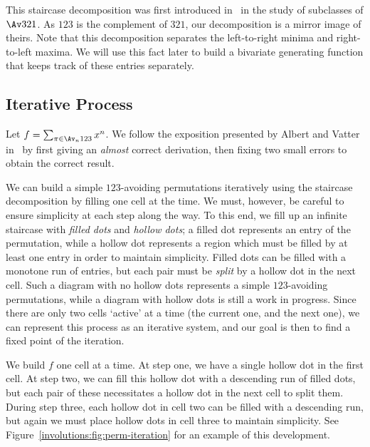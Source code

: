 \documentclass[12pt,twoside]{memoir}
\begin{document}
      This staircase decomposition was first introduced in~\cite{Albert2010} in
      the study of subclasses of $\Av 321$. As $123$ is the complement of $321$,
      our decomposition is a mirror image of theirs. Note that this decomposition
      separates the left-to-right minima and right-to-left maxima. We will use
      this fact later to build a bivariate generating function that keeps track
      of these entries separately. 

    \subsection{Iterative Process}

      Let $f = \sum_{\pi \in \Av_n 123} x^{n}$. We follow the exposition
      presented by Albert and Vatter in~\cite{Vatter2013} by first giving an
      \emph{almost} correct derivation, then fixing two small errors to obtain
      the correct result. 

      We can build a simple $123$-avoiding permutations iteratively using the
      staircase decomposition by filling one cell at the time. We must, however,
      be careful to ensure simplicity at each step along the way. To this end, we
      fill up an infinite staircase with \emph{filled dots} and \emph{hollow
      dots}; a filled dot represents an entry of the permutation, while a hollow
      dot represents a region which must be filled by at least one entry in order
      to maintain simplicity. Filled dots can be filled with a monotone run of
      entries, but each pair must be \emph{split} by a hollow dot in the next
      cell. Such a diagram with no hollow dots represents a simple $123$-avoiding
      permutations, while a diagram with hollow dots is still a work in progress.
      Since there are only two cells `active' at a time (the current one, and the
      next one), we can represent this process as an iterative system, and our
      goal is then to find a fixed point of the iteration. 

      We build $f$ one cell at a time. At step one, we have a single hollow dot
      in the first cell. At step two, we can fill this hollow dot with a
      descending run of filled dots, but each pair of these necessitates a hollow
      dot in the next cell to split them. During step three, each hollow dot in
      cell two can be filled with a descending run, but again we must place
      hollow dots in cell three to maintain simplicity. See
      Figure~\ref{involutions:fig:perm-iteration} for an example of this
      development. 
\end{document}

